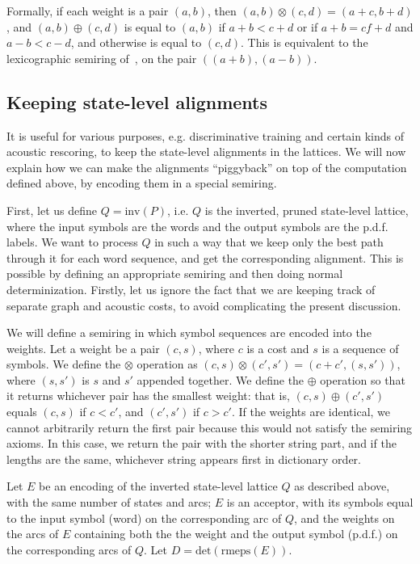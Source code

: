 \documentclass{article}
\def\inv{{\mathrm{inv}}}
\begin{document}
Formally, if each weight is a pair $(a,b)$, then $(a,b) \otimes (c,d) = (a{+}c, b{+}d)$,
and $(a,b) \oplus (c,d)$ is equal to $(a,b)$ if $a{+}b < c{+}d$ or if $a{+}b = c{f}+d$ and $a{-}b < c{-}d$,
and otherwise is equal to $(c,d)$.  This is equivalent to the lexicographic semiring 
of~\cite{roark2011lexicographic}, on the pair $((a{+}b),(a{-}b))$.

\subsection{Keeping state-level alignments}

It is useful for various purposes, e.g. discriminative training and certain kinds of
acoustic rescoring, to keep the state-level alignments in the lattices.  We will now
explain how we can make the alignments ``piggyback'' on top of the computation
defined above, by encoding them in a special semiring.

First, let us define $Q = \inv(P)$, i.e. $Q$ is the inverted, pruned state-level lattice,
where the input symbols are the words and the output symbols are the p.d.f. labels.
We want to process $Q$ in such a way that we keep only the best path through it
for each word sequence, and get the corresponding alignment.  This is possible
by defining an appropriate semiring and then doing normal determinization.  Firstly, 
let us ignore the fact that we are keeping track of separate graph and acoustic costs, 
to avoid complicating the present discussion.  

We will define a semiring in which symbol sequences are encoded into the weights.
Let a weight be a pair $(c, s)$, where $c$ is a cost and $s$ is a sequence of symbols.
We define the $\otimes$ operation as $(c, s) \otimes (c', s') = (c+c', (s,s'))$, where
$(s,s')$ is $s$ and $s'$ appended together.  We define the $\oplus$ operation so that
it returns whichever pair has the smallest weight: that is, $(c,s) \oplus (c',s')$ 
equals $(c,s)$ if $c < c'$, and $(c',s')$ if $c > c'$.  If the weights are identical,
we cannot arbitrarily return the first pair because this would not satisfy the semiring
axioms.  In this case, we return the pair with the shorter string part, and if
the lengths are the same, whichever string appears first in dictionary order. 

Let $E$ be an encoding of the inverted state-level lattice $Q$ 
as described above, with the same number of states and arcs; $E$ is an acceptor, with its symbols
equal to the input symbol (word) on the corresponding arc of $Q$, and
the weights on the arcs of $E$ containing both the the weight and the output symbol (p.d.f.)
on the corresponding arcs of $Q$.  Let $D = \mathrm{det}(\mathrm{rmeps}(E))$.
\end{document}
